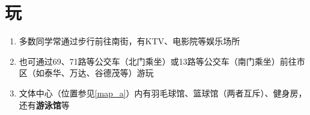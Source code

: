 \section[玩]{玩}
\begin{enumerate}
    \item 多数同学常通过步行前往南街，有KTV、电影院等娱乐场所
    \item 也可通过69、71路等公交车（北门乘坐）或13路等公交车（南门乘坐）前往市区（如泰华、万达、谷德茂等）游玩
    \item 文体中心（位置参见\uline{\ref{map_a}}）内有羽毛球馆、篮球馆（两者互斥）、健身房，还有\textbf{游泳馆}等\footnotemark
\end{enumerate}